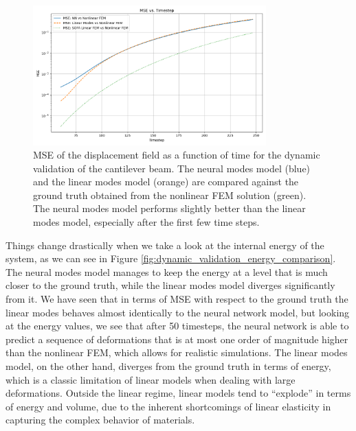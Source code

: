 \begin{figure}[H]
    \centering
    \includegraphics[width=0.8\textwidth]{Images/beam_dynamic_mse.png}
    \caption{MSE of the displacement field as a function of time for the dynamic validation of the cantilever beam. The neural modes model (blue) and the linear modes model (orange) are compared against the ground truth obtained from the nonlinear FEM solution (green). The neural modes model performs slightly better than the linear modes model, especially after the first few time steps.}
    \label{fig:dynamic_validation_mse_comparison}
    \end{figure}

Things change drastically when we take a look at the internal energy of the system, as we can see in Figure \ref{fig:dynamic_validation_energy_comparison}. The neural modes model manages to keep the energy at a level that is much closer to the ground truth, while the linear modes model diverges significantly from it. We have seen that in terms of MSE with respect to the ground truth the linear modes behaves almost identically to the neural network model, but looking at the energy values, we see that after 50 timesteps, the neural network is able to predict a sequence of deformations that is at most one order of magnitude higher than the nonlinear FEM, which allows for realistic simulations. The linear modes model, on the other hand, diverges from the ground truth in terms of energy, which is a classic limitation of linear models when dealing with large deformations. Outside the linear regime, linear models tend to ``explode'' in terms of energy and volume, due to the inherent shortcomings of linear elasticity in capturing the complex behavior of materials.

